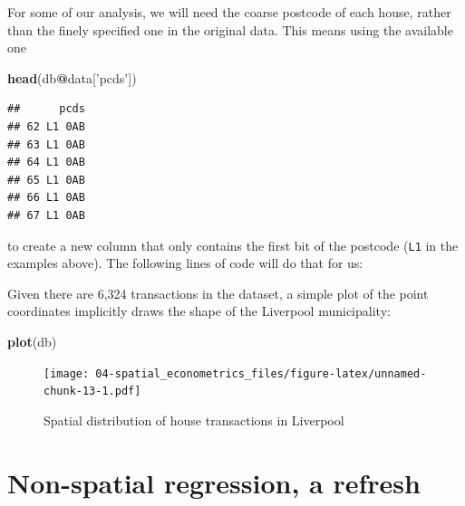 \documentclass[]{book}
\newenvironment{Shaded}{\begin{snugshade}}{\end{snugshade}}
\newcommand{\KeywordTok}[1]{\textcolor[rgb]{0.13,0.29,0.53}{\textbf{#1}}}
\newcommand{\DataTypeTok}[1]{\textcolor[rgb]{0.13,0.29,0.53}{#1}}
\newcommand{\DecValTok}[1]{\textcolor[rgb]{0.00,0.00,0.81}{#1}}
\newcommand{\StringTok}[1]{\textcolor[rgb]{0.31,0.60,0.02}{#1}}
\newcommand{\OperatorTok}[1]{\textcolor[rgb]{0.81,0.36,0.00}{\textbf{#1}}}
\newcommand{\NormalTok}[1]{#1}
\begin{document}
For some of our analysis, we will need the coarse postcode of each
house, rather than the finely specified one in the original data. This
means using the available one

\begin{Shaded}
\begin{Highlighting}[]
\KeywordTok{head}\NormalTok{(db}\OperatorTok{@}\NormalTok{data[}\StringTok{'pcds'}\NormalTok{])}
\end{Highlighting}
\end{Shaded}

\begin{verbatim}
##      pcds
## 62 L1 0AB
## 63 L1 0AB
## 64 L1 0AB
## 65 L1 0AB
## 66 L1 0AB
## 67 L1 0AB
\end{verbatim}

to create a new column that only contains the first bit of the postcode
(\texttt{L1} in the examples above). The following lines of code will do
that for us:

\begin{Shaded}
\begin{Highlighting}[]
\NormalTok{db}\OperatorTok{$}\NormalTok{pc <-}\StringTok{ }\KeywordTok{as.character}\NormalTok{(}\KeywordTok{lapply}\NormalTok{(}\KeywordTok{strsplit}\NormalTok{(}\KeywordTok{as.character}\NormalTok{(db}\OperatorTok{$}\NormalTok{pcds), }\DataTypeTok{split=}\StringTok{" "}\NormalTok{), }\StringTok{"["}\NormalTok{, }\DecValTok{1}\NormalTok{))}
\end{Highlighting}
\end{Shaded}

Given there are 6,324 transactions in the dataset, a simple plot of the
point coordinates implicitly draws the shape of the Liverpool
municipality:

\begin{Shaded}
\begin{Highlighting}[]
\KeywordTok{plot}\NormalTok{(db)}
\end{Highlighting}
\end{Shaded}

\begin{figure}
\centering
\texttt{[image: 04-spatial\_econometrics\_files/figure-latex/unnamed-chunk-13-1.pdf]}
\caption{\label{fig:unnamed-chunk-13}Spatial distribution of house
transactions in Liverpool}
\end{figure}

\section{Non-spatial regression, a
refresh}\label{non-spatial-regression-a-refresh}
\end{document}
